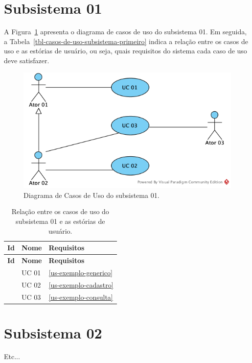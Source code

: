 \section{Subsistema 01}
\label{sec-casos-de-uso-subsistema-primeiro}

A Figura~\ref{fig-casos-de-uso-subsistema-primeiro} apresenta o diagrama de casos de uso do subsistema 01. Em seguida, a Tabela~\ref{tbl-casos-de-uso-subsistema-primeiro} indica a relação entre os casos de uso e as estórias de usuário, ou seja, quais requisitos do sistema cada caso de uso deve satisfazer.

\begin{figure}[h]
	\centering
	\includegraphics[width=.7\textwidth]{figuras/fig-casos-de-uso-subsistema-primeiro.png}
	\caption{Diagrama de Casos de Uso do subsistema 01.}
	\label{fig-casos-de-uso-subsistema-primeiro}
\end{figure}

\begin{longtable}{|c|p{10cm}|p{2.2cm}|}
	\caption{Relação entre os casos de uso do subsistema 01 e as estórias de usuário.}
	\label{tbl-casos-de-uso-subsistema-primeiro} \\\hline 
	
	\rowcolor{lightgray}
	\textbf{Id} & \textbf{Nome} & \textbf{Requisitos}\\\hline	
	\endfirsthead
	\hline
	\rowcolor{lightgray}
	\textbf{Id} & \textbf{Nome} & \textbf{Requisitos} \\\hline	
	\endhead
	
	\UC\label{uc-nucleo-installSystem} & UC 01
	& \ref{us-exemplo-generico}
	\\\hline
	
	\UC\label{uc-nucleo-login} & UC 02
	& \ref{us-exemplo-cadastro}
	\\\hline
	
	\UC\label{uc-nucleo-createAccount} & UC 03
	& \ref{us-exemplo-consulta}
	\\\hline
\end{longtable}

\FloatBarrier



\section{Subsistema 02}
\label{sec-casos-de-uso-subsistema-segundo}

Etc...

\FloatBarrier
